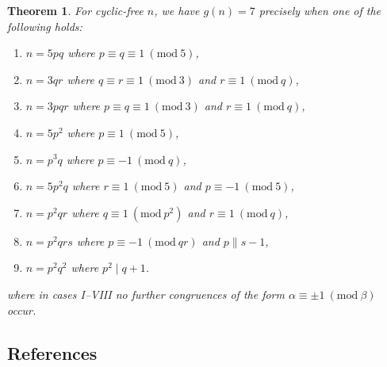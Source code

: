 \documentclass{article}
\newcommand{\Mod}[1]{\ (\mathrm{mod} \ #1)}
\theoremstyle{plain}
\newtheorem{thm}{Theorem}[section]
\theoremstyle{definition}
\begin{document}
\begin{thm}
	For cyclic-free $n$, we have $g(n) = 7$ precisely when one of the following holds:
	\begin{enumerate}	\listspace
		\item $n = 5pq$ where $p \equiv q \equiv 1 \Mod{5}$,
		\item $n = 3qr$ where $q \equiv r \equiv 1 \Mod{3}$ and $r \equiv 1 \Mod{q}$,
		\item $n = 3pqr$ where $p \equiv q \equiv 1 \Mod{3}$ and $r \equiv 1 \Mod{q}$,
		\item $n = 5p^2$ where $p \equiv 1 \Mod{5}$,
		\item $n = p^3 q$ where $p \equiv -1 \Mod{q}$,
		\item $n = 5p^2 q$ where $r \equiv 1 \Mod{5}$ and $p \equiv -1 \Mod{5}$,
		\item $n = p^2 q r$ where $q \equiv 1 \Mod{p^2}$ and $r \equiv 1 \Mod{q}$,
		\item $n = p^2 q r s$ where $p \equiv -1 \Mod{qr}$ and $p \parallel s - 1$,
		\item $n = p^2 q^2$ where $p^2 \mid q + 1$.
	\end{enumerate} \textspace
	where in cases I--VIII no further congruences of the form $\alpha \equiv \pm 1 \Mod{\beta}$ \nolinebreak[4] \mbox{occur}.
\end{thm}

\begin{center}\section*{References}\end{center}
\printbibliography[heading=none]
\end{document}
